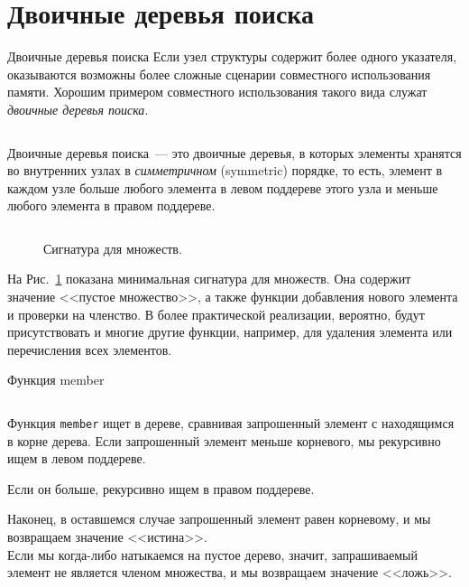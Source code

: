 \documentclass[aspectratio=169
  , xcolor={svgnames}
  , hyperref={ colorlinks,citecolor=DeepPink4
             , linkcolor=DarkRed,urlcolor=DarkBlue}
  , russian
  ]{beamer}
\newcommand{\term}[2]{\textit{#1} (#2)}
\theoremstyle{exerciseStyle1}
\begin{document}
\section{Двоичные деревья поиска}

\begin{frame}{Двоичные деревья поиска}
Если узел структуры содержит более одного указателя, оказываются
возможны более сложные сценарии совместного использования памяти. Хорошим примером
совместного использования такого вида служат \emph{двоичные деревья поиска}.

\inputminted[firstline=10, lastline=10] {haskell}{code/SearchTree.hs}

Двоичные деревья поиска~--- это двоичные деревья, в которых элементы
хранятся во внутренних узлах в \term{симметричном}{symmetric}
порядке, то есть, элемент в каждом узле больше любого элемента в
левом поддереве этого узла и меньше любого элемента в правом
поддереве.
\end{frame}

\begin{frame}[fragile]{}
\begin{figure}[h]
  \centering
  \inputminted[firstline=12, lastline=16] {haskell}{code/SearchTree.hs}
  \caption{Сигнатура для множеств.}
\label{fig:2.7}
\end{figure}

На Рис.~\ref{fig:2.7} показана минимальная сигнатура для множеств. Она
содержит значение <<пустое множество>>, а также функции добавления
нового элемента и проверки на членство.  В более практической
реализации, вероятно, будут присутствовать и многие другие функции,
например, для удаления элемента или перечисления всех элементов.
\end{frame}

\begin{frame}[fragile]{Функция member}
  \inputminted[firstline=22, lastline=25] {haskell}{code/SearchTree.hs}

Функция \texttt{member} ищет в дереве, сравнивая запрошенный
элемент с находящимся в корне дерева. Если запрошенный элемент меньше
корневого, мы рекурсивно ищем в левом поддереве.

 Если он больше,
рекурсивно ищем в правом поддереве. 

Наконец, в оставшемся случае
запрошенный элемент равен корневому, и мы возвращаем значение
<<истина>>. \\

Если мы когда-либо натыкаемся на пустое дерево, значит,
запрашиваемый элемент не является членом множества, и мы возвращаем
значение <<ложь>>. 
\end{frame}
\end{document}
